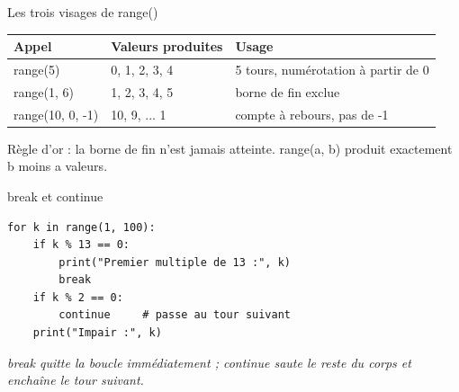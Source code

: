 \documentclass[aspectratio=169,11pt]{beamer}
\begin{document}
\begin{frame}{Les trois visages de range()}
\renewcommand{\arraystretch}{1.3}\small
\begin{center}
\begin{tabular}{lll}
\toprule
\textbf{\color{PyBleu}Appel} & \textbf{\color{PyBleu}Valeurs produites} & \textbf{\color{PyBleu}Usage} \\
\midrule
range(5) & 0, 1, 2, 3, 4 & 5 tours, numérotation à partir de 0 \\
range(1, 6) & 1, 2, 3, 4, 5 & borne de fin exclue \\
range(10, 0, -1) & 10, 9, ... 1 & compte à rebours, pas de -1 \\
\bottomrule
\end{tabular}
\end{center}

\vspace{4pt}

{\small\color{PyGris}Règle d'or : la borne de fin n'est jamais atteinte. range(a, b) produit exactement b moins a valeurs.}
\end{frame}

\begin{frame}[fragile]{break et continue}

\begin{lstlisting}[style=py]
for k in range(1, 100):
    if k % 13 == 0:
        print("Premier multiple de 13 :", k)
        break
    if k % 2 == 0:
        continue     # passe au tour suivant
    print("Impair :", k)
\end{lstlisting}
\vspace{0.5pt}

{\small\color{PyGris}\itshape break quitte la boucle immédiatement ; continue saute le reste du corps et enchaîne le tour suivant.}

\end{frame}
\end{document}
